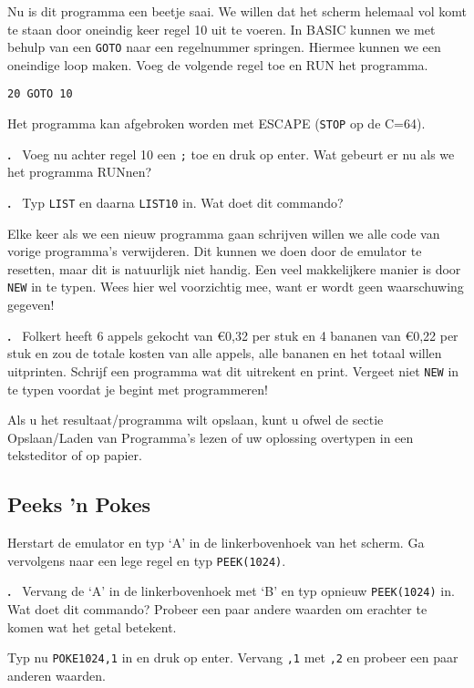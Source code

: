 \documentclass{article}
\newcounter{problem}
\newcounter{solution}
\newcommand\problem{%
  \stepcounter{problem}%
  \textbf{\theproblem.}~%
  \setcounter{solution}{0}%
}
\begin{document}
Nu is dit programma een beetje saai.
We willen dat het scherm helemaal vol komt te staan door oneindig keer regel 10 uit te voeren.
In BASIC kunnen we met behulp van een \verb:GOTO: naar een regelnummer springen.
Hiermee kunnen we een oneindige loop maken.
Voeg de volgende regel toe en RUN het programma.

\begin{lstlisting}
20 GOTO 10
\end{lstlisting}

Het programma kan afgebroken worden met ESCAPE (\verb:STOP: op de C=64).

\problem Voeg nu achter regel 10 een \verb:;: toe en druk op enter. Wat gebeurt er nu als we het programma RUNnen?

\problem Typ \verb:LIST: en daarna \verb:LIST10: in. Wat doet dit commando?

Elke keer als we een nieuw programma gaan schrijven willen we alle code van vorige programma's verwijderen.
Dit kunnen we doen door de emulator te resetten, maar dit is natuurlijk niet handig.
Een veel makkelijkere manier is door \verb:NEW: in te typen.
Wees hier wel voorzichtig mee, want er wordt geen waarschuwing gegeven!

\problem Folkert heeft 6 appels gekocht van \euro 0,32 per stuk en 4 bananen van \euro 0,22 per stuk en zou de totale kosten van alle appels, alle bananen en het totaal willen uitprinten.
Schrijf een programma wat dit uitrekent en print. Vergeet niet \verb:NEW: in te typen voordat je begint met programmeren!

Als u het resultaat/programma wilt opslaan, kunt u ofwel de sectie Opslaan/Laden van Programma's lezen of uw oplossing overtypen in een teksteditor of op papier.

\subsection{Peeks 'n Pokes}

Herstart de emulator en typ `A' in de linkerbovenhoek van het scherm.
Ga vervolgens naar een lege regel en typ \verb:PEEK(1024):.

\problem Vervang de `A' in de linkerbovenhoek met `B' en typ opnieuw \verb:PEEK(1024): in.
Wat doet dit commando? Probeer een paar andere waarden om erachter te komen wat het getal betekent.

Typ nu \verb:POKE1024,1: in en druk op enter. Vervang \verb:,1: met \verb:,2: en probeer een paar anderen waarden.
\end{document}

